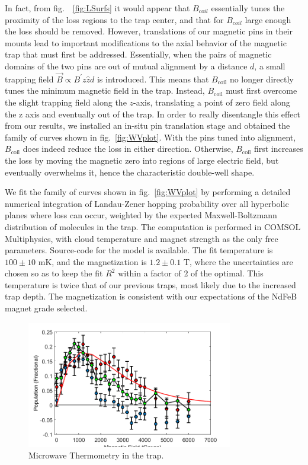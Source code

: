 \documentclass[%
 reprint,
 amsmath,amssymb,
 aps,
prl,
]{revtex4-1}
\begin{document}
In fact, from fig.~~\ref{fig:LSurfs} it would appear that $B_{coil}$ essentially tunes the proximity of the loss regions to the trap center, and that for $B_{coil}$ large enough the loss should be removed. However, translations of our magnetic pins in their mounts lead to important modifications to the axial behavior of the magnetic trap that must first be addressed. Essentially, when the pairs of magnetic domains of the two pins are out of mutual alignment by a distance $d$, a small trapping field $\vec{B}\propto B^\prime z\hat{z} d$ is introduced. This means that $B_\text{coil}$ no longer directly tunes the minimum magnetic field in the trap. Instead, $B_\text{coil}$ must first overcome the slight trapping field along the $z$-axis, translating a point of zero field along the z axis and eventually out of the trap. In order to really disentangle this effect from our results, we installed an in-situ pin translation stage and obtained the family of curves shown in fig.~\ref{fig:WVplot}. With the pins tuned into alignment, $B_\text{coil}$ does indeed reduce the loss in either direction. Otherwise, $B_\text{coil}$ first increases the loss by moving the magnetic zero into regions of large electric field, but eventually overwhelms it, hence the characteristic double-well shape. 

We fit the family of curves shown in fig.~\ref{fig:WVplot} by performing a detailed numerical integration of Landau-Zener hopping probability over all hyperbolic planes where loss can occur, weighted by the expected Maxwell-Boltzmann distribution of molecules in the trap. The computation is performed in COMSOL Multiphysics, with cloud temperature and magnet strength as the only free parameters. Source-code for the model is available.\cite{ref:githubCOMcode} The fit temperature is $100\pm10\text{ mK}$, and the magnetization is $1.2\pm0.1\text{ T}$, where the uncertainties are chosen so as to keep the fit $R^2$ within a factor of $2$ of the optimal. This temperature is twice that of our previous traps, most likely due to the increased trap depth. The magnetization is consistent with our expectations of the NdFeB magnet grade selected.

\begin{figure}
\includegraphics[width=90mm]{MW-thermometry.png}%
\caption{
Microwave Thermometry in the trap.
\label{fig:spec}}
\end{figure}
\end{document}
